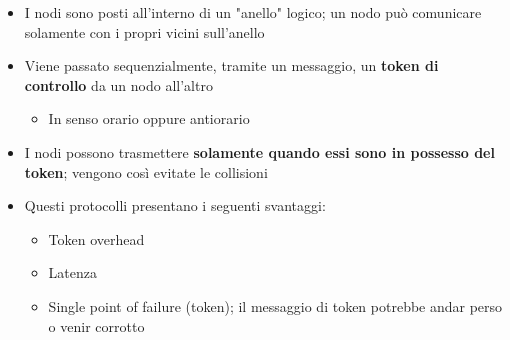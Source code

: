 \documentclass[12pt]{article}
\begin{document}
\begin{itemize}
    \item I nodi sono posti all'interno di un "anello" logico; un nodo può comunicare solamente con i propri vicini sull'anello
    \item Viene passato sequenzialmente, tramite un messaggio, un \textbf{token di controllo} da un nodo all'altro
    \begin{itemize}
        \item In senso orario oppure antiorario
    \end{itemize}
    \item I nodi possono trasmettere \textbf{solamente quando essi sono in possesso del token}; vengono così evitate le collisioni
    \item Questi protocolli presentano i seguenti svantaggi:
    \begin{itemize}
        \item Token overhead
        \item Latenza
        \item Single point of failure (token); il messaggio di token potrebbe andar perso o venir corrotto
    \end{itemize}
\end{itemize}
\end{document}
